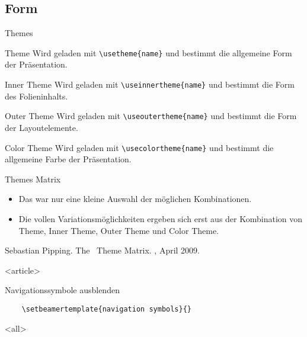 
\subsection{Form}

\begin{Frame}[fragile]{Themes}
  \begin{Block}{Theme}
    Wird geladen mit \lstinline-\usetheme{name}- und bestimmt die
    \alert{allgemeine Form} der Präsentation.
  \end{Block}

  \begin{Block}{Inner Theme}
    Wird geladen mit \lstinline-\useinnertheme{name}- und bestimmt
    die \alert{Form des Folieninhalts}.
  \end{Block}

  \begin{Block}{Outer Theme}
    Wird geladen mit \lstinline-\useoutertheme{name}- und bestimmt
    die \alert{Form der Layoutelemente}.
  \end{Block}

  \begin{Block}{Color Theme}
    Wird geladen mit \lstinline-\usecolortheme{name}- und bestimmt
    die \alert{allgemeine Farbe} der Präsentation.
  \end{Block}
\end{Frame}








\begin{Frame}{Themes Matrix}
  \begin{itemize}
    \item Das war nur eine kleine Auswahl der möglichen Kombinationen.
    \item Die vollen Variationsmöglichkeiten ergeben sich erst aus der
      Kombination von Theme, Inner Theme, Outer Theme und Color Theme.
  \end{itemize}

  \xxx

  \begin{mybib}
      Sebastian Pipping.
      \newblock The \beamer\ Theme Matrix.
      \newblock {}, April 2009.
  \end{mybib}
\end{Frame}

\mode
<article>

\begin{Block}{Navigationssymbole ausblenden}
  \begin{lstlisting}[gobble=4]
    % hide navigation symbols
    \setbeamertemplate{navigation symbols}{}
  \end{lstlisting}
\end{Block}

\mode
<all>

